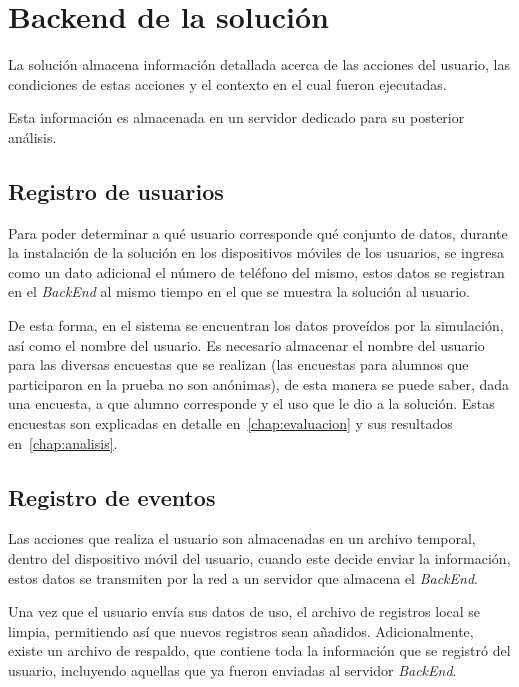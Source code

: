 \section{Backend de la solución}

La solución almacena información detallada acerca de las acciones del usuario,
las condiciones de estas acciones y el contexto en el cual fueron ejecutadas.

Esta información es almacenada en un servidor dedicado para su posterior
análisis.

\subsection{Registro de usuarios}


Para poder determinar a qué usuario corresponde qué conjunto de datos, durante la
instalación de la solución en los dispositivos móviles de los usuarios, se ingresa como
un dato adicional el número de teléfono del mismo, estos datos se registran
en el \textit{BackEnd} al mismo tiempo en el que se muestra la solución al usuario.

De esta forma, en el sistema se encuentran los datos proveídos por la
simulación, así como el nombre del usuario. Es necesario almacenar el nombre del
usuario para las diversas encuestas que se realizan (las encuestas para alumnos
que participaron en la prueba no son anónimas), de esta manera se puede
saber, dada una encuesta, a que alumno corresponde y el uso que le dio a la
solución. Estas encuestas son explicadas en detalle en~\ref{chap:evaluacion} y sus 
resultados en~\ref{chap:analisis}.

\subsection{Registro de eventos}
\label{sec:backend_reg_eventos}

Las acciones que realiza el usuario son almacenadas en un archivo temporal,
dentro del dispositivo móvil del usuario, cuando este decide enviar la
información, estos datos se transmiten por la red a un servidor que almacena el
\textit{BackEnd}.

Una vez que el usuario envía sus datos de uso, el archivo de registros
local se limpia, permitiendo así que nuevos registros sean añadidos.
Adicionalmente, existe un archivo de respaldo, que contiene toda la información
que se registró del usuario, incluyendo aquellas que ya fueron enviadas al
servidor \textit{BackEnd}.

